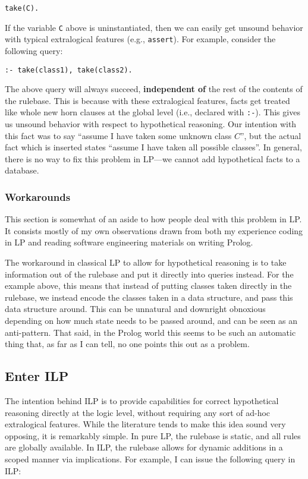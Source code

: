 \begin{verbatim}
take(C).
\end{verbatim}

\noindent If the variable \texttt{C} above is uninstantiated, then we can easily get unsound behavior with typical extralogical features (e.g., \texttt{assert}).
For example, consider the following query:

\begin{verbatim}
:- take(class1), take(class2).
\end{verbatim}

\noindent The above query will always succeed, \textbf{independent of} the rest of the contents of the rulebase.
This is because with these extralogical features, facts get treated like whole new horn clauses at the global level (i.e., declared with \texttt{:-}).
This gives us unsound behavior with respect to hypothetical reasoning.
Our intention with this fact was to say ``assume I have taken some unknown class $C$'', but the actual fact which is inserted states ``assume I have taken all possible classes''.
In general, there is no way to fix this problem in LP---we cannot add hypothetical facts to a database.

\subsubsection{Workarounds}
This section is somewhat of an aside to how people deal with this problem in LP.
It consists mostly of my own observations drawn from both my experience coding in LP and reading software engineering materials on writing Prolog.

The workaround in classical LP to allow for hypothetical reasoning is to take information out of the rulebase and put it directly into queries instead.
For the example above, this means that instead of putting classes taken directly in the rulebase, we instead encode the classes taken in a data structure, and pass this data structure around.
This can be unnatural and downright obnoxious depending on how much state needs to be passed around, and can be seen as an anti-pattern.
That said, in the Prolog world this seems to be such an automatic thing that, as far as I can tell, no one points this out as a problem.


\subsection{Enter ILP}
The intention behind ILP is to provide capabilities for correct hypothetical reasoning directly at the logic level, without requiring any sort of ad-hoc extralogical features.
While the literature tends to make this idea sound very opposing, it is remarkably simple.
In pure LP, the rulebase is static, and all rules are globally available.
In ILP, the rulebase allows for dynamic additions in a scoped manner via implications.
For example, I can issue the following query in ILP:

